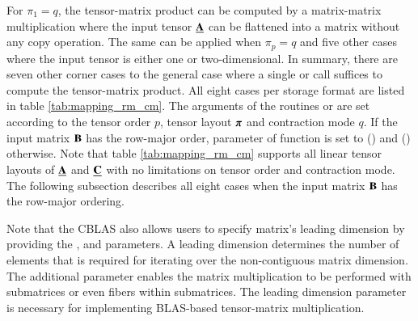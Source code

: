For $\pi_1 = q$, the tensor-matrix product can be computed by a matrix-matrix multiplication where the input tensor $\underline{\mathbf{A}}$ can be flattened into a matrix without any copy operation.
The same can be applied when $\pi_p = q$ and five other cases where the input tensor is either one or two-dimensional.
In summary, there are seven other corner cases to the general case where a single  or  call suffices to compute the tensor-matrix product.
All eight cases per storage format are listed in table \ref{tab:mapping_rm_cm}.
The arguments of the routines  or  are set according to the tensor order $p$, tensor layout $\boldsymbol{\pi}$ and contraction mode $q$.
If the input matrix $\mathbf{B}$ has the row-major order, parameter  of function  is set to  () and  () otherwise.
Note that table \ref{tab:mapping_rm_cm} supports all linear tensor layouts of $\underline{\mathbf{A}}$ and $\underline{\mathbf{C}}$ with no limitations on tensor order and contraction mode.
The following subsection describes all eight cases when the input matrix $\mathbf{B}$ has the row-major ordering.

Note that the CBLAS also allows users to specify matrix's leading dimension by providing the ,  and  parameters.
A leading dimension determines the number of elements that is required for iterating over the non-contiguous matrix dimension.
The additional parameter enables the matrix multiplication to be performed with submatrices or even fibers within submatrices.
The leading dimension parameter is necessary for implementing BLAS-based tensor-matrix multiplication.





